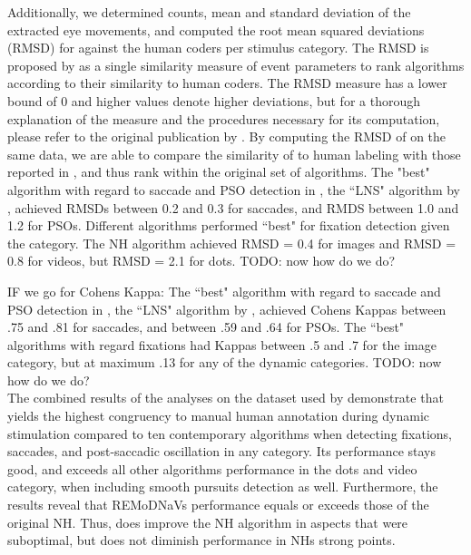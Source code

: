 Additionally, we determined counts, mean and standard deviation of the extracted eye movements, and computed the root
mean squared deviations (RMSD) for \remodnav against the human coders per stimulus category. The RMSD is proposed by
\cite{Andersson2017} as a single similarity measure of event parameters to rank algorithms according to their
similarity to human coders. The RMSD measure has a lower bound of 0 and higher values denote higher deviations,
but for a thorough explanation of the measure and the procedures necessary for its computation, please refer to the
original publication by \cite{Andersson2017}. By computing the RMSD of \remodnav on the same data, we are able to
compare the similarity of \remodnav to human labeling with those reported in \cite{Andersson2017}, and thus rank
\remodnav within the original set of algorithms. 
The "best" algorithm with regard to saccade and PSO detection in \cite{Andersson2017}, the ``LNS" algorithm by
\cite{Larsson2013}, achieved RMSDs between 0.2 and 0.3 for saccades, and RMDS between 1.0 and 1.2 for PSOs. Different
algorithms performed ``best" for fixation detection given the category. The NH algorithm achieved RMSD = 0.4 for
images and RMSD = 0.8 for videos, but RMSD = 2.1 for dots. TODO: now how do we do?

IF we go for Cohens Kappa: The ``best" algorithm with regard to saccade and PSO detection in \cite{Andersson2017}, the
``LNS" algorithm by \cite{Larsson2013}, achieved Cohens Kappas between .75 and .81 for saccades, and between .59 and
.64 for PSOs. The ``best" algorithms with regard fixations had Kappas between .5 and .7 for the image category, but
at maximum .13 for any of the dynamic categories. TODO: now how do we do? \\

The combined results of the analyses on the dataset used by \citet{Andersson2017} demonstrate that \remodnav yields
the highest congruency to manual human annotation during dynamic stimulation compared to ten contemporary
algorithms when detecting fixations, saccades, and post-saccadic oscillation in any category. Its performance
stays good, and exceeds all other algorithms performance in the dots and video category, when including smooth
pursuits detection as well. Furthermore, the results reveal that REMoDNaVs performance equals or exceeds those of
the original NH. Thus, \remodnav does improve the NH algorithm in aspects that were suboptimal, but does not
diminish performance in NHs strong points.


